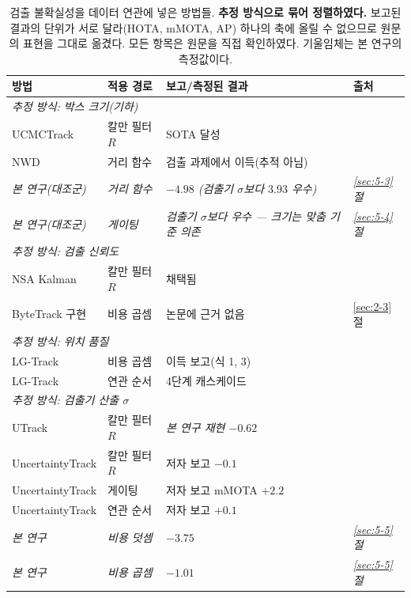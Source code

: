 \documentclass[12pt,a4paper,oneside]{report}
\begin{document}
\begin{table}[htbp]
\centering
\small
\caption{검출 불확실성을 데이터 연관에 넣은 방법들. \textbf{추정 방식으로 묶어 정렬하였다.} 보고된 결과의 단위가 서로 달라(HOTA, mMOTA, AP) 하나의 축에 올릴 수 없으므로 원문의 표현을 그대로 옮겼다. 모든 항목은 원문을 직접 확인하였다. 기울임체는 본 연구의 측정값이다.}
\label{tab:landscape}
\begin{tabular}{llll}
\toprule
방법 & 적용 경로 & 보고/측정된 결과 & 출처 \\
\midrule
\multicolumn{4}{l}{\textit{추정 방식: 박스 크기(기하)}} \\
UCMCTrack & 칼만 필터 $R$ & SOTA 달성 & \citep{yi2024} \\
NWD & 거리 함수 & 검출 과제에서 이득(추적 아님) & \citep{wang2021} \\
\textit{본 연구(대조군)} & \textit{거리 함수} & \textit{$-4.98$ (검출기 $\sigma$보다 $3.93$ 우수)} & \textit{\ref{sec:5-3}절} \\
\textit{본 연구(대조군)} & \textit{게이팅} & \textit{검출기 $\sigma$보다 우수 --- 크기는 맞춤 기준 의존} & \textit{\ref{sec:5-4}절} \\
\midrule
\multicolumn{4}{l}{\textit{추정 방식: 검출 신뢰도}} \\
NSA Kalman & 칼만 필터 $R$ & 채택됨 & \citep{du2023} \\
ByteTrack 구현 & 비용 곱셈 & 논문에 근거 없음 & \ref{sec:2-3}절 \\
\midrule
\multicolumn{4}{l}{\textit{추정 방식: 위치 품질}} \\
LG-Track & 비용 곱셈 & 이득 보고(식 1, 3) & \citep{meng2023} \\
LG-Track & 연관 순서 & 4단계 캐스케이드 & \citep{meng2023} \\
\midrule
\multicolumn{4}{l}{\textit{추정 방식: 검출기 산출 $\sigma$}} \\
UTrack & 칼만 필터 $R$ & \textit{본 연구 재현 $-0.62$} & \citep{solano2024} \\
UncertaintyTrack & 칼만 필터 $R$ & 저자 보고 $-0.1$ & \citep{lee2024} \\
UncertaintyTrack & 게이팅 & 저자 보고 mMOTA $+2.2$ & \citep{lee2024} \\
UncertaintyTrack & 연관 순서 & 저자 보고 $+0.1$ & \citep{lee2024} \\
\textit{본 연구} & \textit{비용 덧셈} & \textit{$-3.75$} & \textit{\ref{sec:5-5}절} \\
\textit{본 연구} & \textit{비용 곱셈} & \textit{$-1.01$} & \textit{\ref{sec:5-5}절} \\

\end{tabular}
\end{table}
\end{document}
